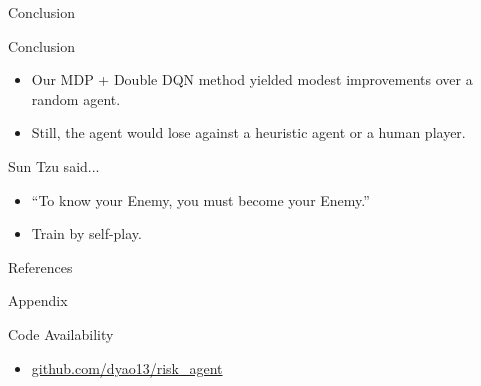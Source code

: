\documentclass{beamer}
\begin{document}
\begin{frame}{Conclusion}

\begin{block}{Conclusion}
\begin{itemize}
\item Our MDP + Double DQN method yielded modest improvements over a random agent.
\item Still, the agent would lose against a heuristic agent or a human player.
\end{itemize}
\end{block}

\begin{block}{Sun Tzu said... \cite{sun_tzu_art_of_war_132}}
\begin{itemize}
\item “To know your Enemy, you must become your Enemy.”
\item Train by self-play.
\end{itemize}
\end{block}

\end{frame}


\begin{frame}{References}




\end{frame}


\begin{frame}{Appendix}

\begin{block}{Code Availability}
\begin{itemize}
\item \href{https://github.com/dyao13/risk\_agent}{github.com/dyao13/risk\_agent}
\end{itemize}
\end{block}

\end{frame}
\end{document}
